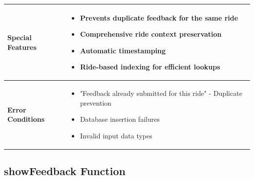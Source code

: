 \documentclass[11pt,a4paper]{article}
\begin{document}
\begin{longtable}{|p{4cm}|p{12cm}|}
\hline
\textbf{Special Features} & 
\begin{itemize}[nosep]
\item Prevents duplicate feedback for the same ride
\item Comprehensive ride context preservation
\item Automatic timestamping
\item Ride-based indexing for efficient lookups
\end{itemize} \\
\hline
\textbf{Error Conditions} & 
\begin{itemize}[nosep]
\item "Feedback already submitted for this ride" - Duplicate prevention
\item Database insertion failures
\item Invalid input data types
\end{itemize} \\
\hline
\end{longtable}

\subsection{showFeedback Function}
\end{document}
